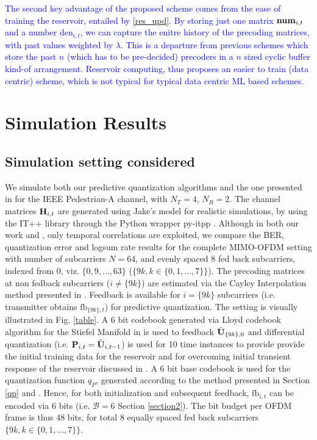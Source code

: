 \documentclass[conference]{IEEEtran}
\begin{document}
\textcolor{blue}{The second key advantage of the proposed scheme comes from the ease of training the reservoir, entailed by \eqref{res_upd}.
By storing just one matrix $\text{\textbf{num}}_{i,t}$ and a number $\text{den}_{i,t}$, we can capture the enitre history of the precoding matrices, with past values weighted by $\lambda$.
This is a departure from previous schemes \cite{Gupt1905:Predictive,6891198,6545375} which store the past $n$ (which has to be pre-decided) precoders in a $n$ sized cyclic buffer kind-of arrangement.
Reservoir computing, thus proposes an easier to train (data centric) scheme, which is not typical for typical data centric ML based schemes.}


\section{Simulation Results}
\label{section4}
\subsection{Simulation setting considered}
\label{setting}
\noindent We simulate both our predictive quantization algorithms and the one presented in \cite{6891198} for the IEEE Pedestrian-A channel, with $N_T=4$, $N_R=2$. 
The channel matrices ${\bf H}_{i,t}$ are generated using Jake’s model for realistic simulations, by using the IT++ library through the Python wrapper py-itpp \cite{ViditPy}. 
Although in both our work and \cite{6891198}, only temporal correlations are exploited, we compare the BER, quantization error and logsum rate results for the complete MIMO-OFDM setting with number of subcarriers $N=64$, and evenly spaced $8$ fed back subcarriers, indexed from 0, viz. $\{0,9,\ldots,63\}$ ($\{9k, k \in \{0,1,\ldots,7\}\}$). The precoding matrices at non fedback subcarriers ($i\neq\{9k\}$) are estimated via the Cayley Interpolation method presented in \cite{Gupt1905:Predictive}. Feedback is available for $i=\{9k\}$ subcarriers (i.e. transmitter obtains $\text{fb}_{\{9k\},t}$) for predictive quantization. The setting is visually illustrated in Fig. \ref{table}. A 6 bit codebook generated via Lloyd codebook algorithm for the Stiefel Manifold in \cite{6678348} is used to feedback $\tilde{{\bf U}}_{\{9k\},0}$ and differential quantization (i.e. ${\bf P}_{i,t}=\tilde{{\bf U}}_{i,t-1}$) is used for 10 time instances to provide provide the initial training data for the reservoir and for overcoming initial transient response of the reservoir discussed in \cite{mosleh2017brain}. A 6 bit base codebook is used for the quantization function $q_P$, generated according to the method presented in Section \ref{qp} and \cite{Gupt1905:Predictive}. Hence, for both initialization and subsequent feedback, $\text{fb}_{i,t}$ can be encoded via 6 bits (i.e. $\mathcal{B}=6$ Section \ref{section2}). The bit budget per OFDM frame is thus 48 bits, for total 8 equally spaced fed back subcarriers $\{9k, k \in \{0,1,\ldots,7\}\}$.
\end{document}
